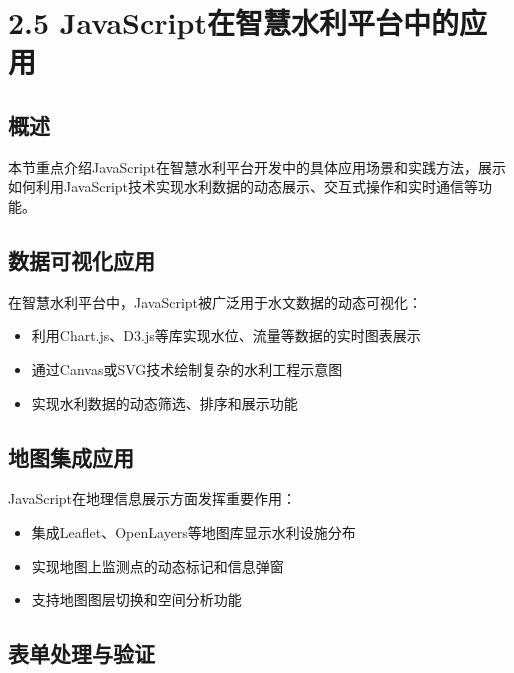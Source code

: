 \section{2.5
JavaScript在智慧水利平台中的应用}\label{javascriptux5728ux667aux6167ux6c34ux5229ux5e73ux53f0ux4e2dux7684ux5e94ux7528}

\subsection{概述}\label{ux6982ux8ff0}

本节重点介绍JavaScript在智慧水利平台开发中的具体应用场景和实践方法，展示如何利用JavaScript技术实现水利数据的动态展示、交互式操作和实时通信等功能。

\subsection{数据可视化应用}\label{ux6570ux636eux53efux89c6ux5316ux5e94ux7528}

在智慧水利平台中，JavaScript被广泛用于水文数据的动态可视化：

\begin{itemize}
\tightlist
\item
  利用Chart.js、D3.js等库实现水位、流量等数据的实时图表展示
\item
  通过Canvas或SVG技术绘制复杂的水利工程示意图
\item
  实现水利数据的动态筛选、排序和展示功能
\end{itemize}

\subsection{地图集成应用}\label{ux5730ux56feux96c6ux6210ux5e94ux7528}

JavaScript在地理信息展示方面发挥重要作用：

\begin{itemize}
\tightlist
\item
  集成Leaflet、OpenLayers等地图库显示水利设施分布
\item
  实现地图上监测点的动态标记和信息弹窗
\item
  支持地图图层切换和空间分析功能
\end{itemize}

\subsection{表单处理与验证}\label{ux8868ux5355ux5904ux7406ux4e0eux9a8cux8bc1}


